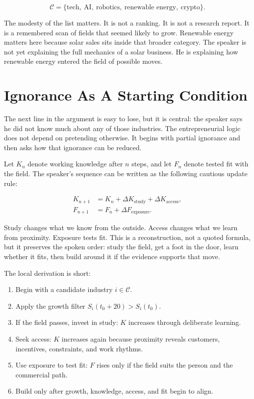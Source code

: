 \begin{equation}
\mathcal{C}
=
\{\text{tech},\ \text{AI},\ \text{robotics},\
\text{renewable energy},\ \text{crypto}\}.
\end{equation}

The modesty of the list matters. It is not a ranking. It is not a research report. It is a remembered scan of fields that seemed likely to grow. Renewable energy matters here because solar sales sits inside that broader category. The speaker is not yet explaining the full mechanics of a solar business. He is explaining how renewable energy entered the field of possible moves.

\section{Ignorance As A Starting Condition}

The next line in the argument is easy to lose, but it is central: the speaker says he did not know much about any of those industries. The entrepreneurial logic does not depend on pretending otherwise. It begins with partial ignorance and then asks how that ignorance can be reduced.

Let \(K_n\) denote working knowledge after \(n\) steps, and let \(F_n\) denote tested fit with the field. The speaker's sequence can be written as the following cautious update rule:

\begin{align}
K_{n+1} &= K_n
+ \Delta K_{\mathrm{study}}
+ \Delta K_{\mathrm{access}},\\
F_{n+1} &= F_n
+ \Delta F_{\mathrm{exposure}}.
\end{align}

Study changes what we know from the outside. Access changes what we learn from proximity. Exposure tests fit. This is a reconstruction, not a quoted formula, but it preserves the spoken order: study the field, get a foot in the door, learn whether it fits, then build around it if the evidence supports that move.

The local derivation is short:

\begin{enumerate}
\item Begin with a candidate industry \(i \in \mathcal{C}\).
\item Apply the growth filter \(S_i(t_0+20) > S_i(t_0)\).
\item If the field passes, invest in study: \(K\) increases through deliberate learning.
\item Seek access: \(K\) increases again because proximity reveals customers, incentives, constraints, and work rhythms.
\item Use exposure to test fit: \(F\) rises only if the field suits the person and the commercial path.
\item Build only after growth, knowledge, access, and fit begin to align.
\end{enumerate}

